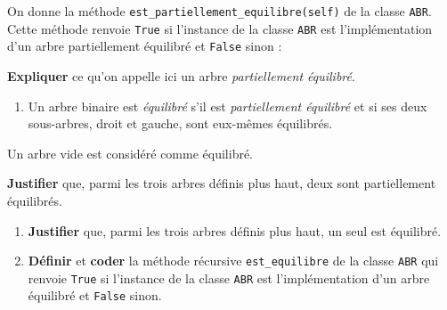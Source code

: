 On donne la méthode \texttt{est\_partiellement\_equilibre(self)} de la
classe \texttt{ABR}. Cette méthode renvoie \texttt{True} si l'instance
de la classe \texttt{ABR} est l'implémentation d'un arbre partiellement
équilibré et \texttt{False} sinon :

\begin{Shaded}
\begin{Highlighting}[]
 \NormalTok{) :}
   
       
   \NormalTok{(}\OperatorTok{{-}}
                \OperatorTok{\textless{}=} \NormalTok{)}
\end{Highlighting}
\end{Shaded}

\textbf{Expliquer} ce qu'on appelle ici un arbre \emph{partiellement
équilibré}.

\begin{enumerate}
\def\labelenumi{\arabic{enumi}.}
\setcounter{enumi}{9}
\tightlist
\item
  Un arbre binaire est \emph{équilibré} s'il est \emph{partiellement
  équilibré} et si ses deux sous-arbres, droit et gauche, sont eux-mêmes
  équilibrés.
\end{enumerate}

Un arbre vide est considéré comme équilibré.

\textbf{Justifier} que, parmi les trois arbres définis plus haut, deux
sont partiellement équilibrés.

\begin{enumerate}
\def\labelenumi{\arabic{enumi}.}
\setcounter{enumi}{10}
\item
  \textbf{Justifier} que, parmi les trois arbres définis plus haut, un
  seul est équilibré.
\item
  \textbf{Définir} et \textbf{coder} la méthode récursive
  \texttt{est\_equilibre} de la classe \texttt{ABR} qui renvoie
  \texttt{True} si l'instance de la classe \texttt{ABR} est
  l'implémentation d'un arbre équilibré et \texttt{False} sinon.
\end{enumerate}
